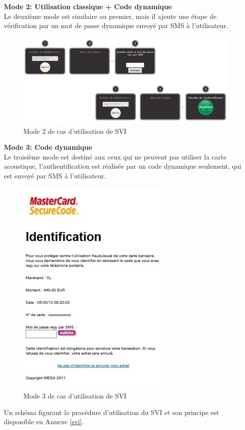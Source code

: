 \newpage
\textbf{Mode 2: Utilisation classique + Code dynamique}\\
Le deuxième mode est similaire au premier, mais il ajoute une étape de vérification par un mot de passe dynamique envoyé par SMS à l'utilisateur.

\begin{figure}[!htbp]
  \centering
    \includegraphics[scale=1]{images/mode2}
  \caption{Mode 2 de cas d’utilisation de SVI}
\end{figure}
\newpage

\textbf{Mode 3: Code dynamique}\\
Le troisième mode est destiné aux ceux qui ne peuvent pas utiliser la carte acoustique, l'authentification est réalisée par un code dynamique seulement, qui est envoyé par SMS à l'utilisateur.%

\begin{figure}[!htbp]
  \centering
    \includegraphics[scale=1]{images/mode3}
  \caption{Mode 3 de cas d’utilisation de SVI}
\end{figure}

Un schéma figurant la procédure d'utilisation du SVI et son principe est disponible en Annexe \ref{svi}.


